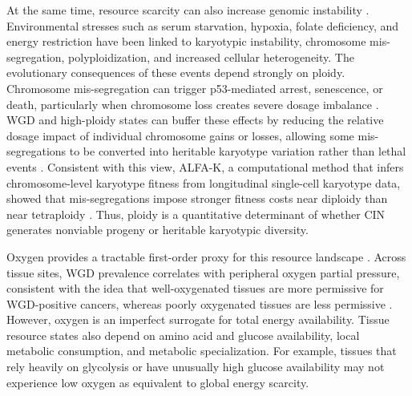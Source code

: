 \documentclass[11pt]{article}
\begin{document}
At the same time, resource scarcity can also increase genomic instability \cite{nowicka_interactions_2025,beck_energetics_2025}. Environmental stresses such as serum starvation, hypoxia, folate deficiency, and energy restriction have been linked to karyotypic instability, chromosome mis-segregation, polyploidization, and increased cellular heterogeneity. The evolutionary consequences of these events depend strongly on ploidy. Chromosome mis-segregation can trigger p53-mediated arrest, senescence, or death, particularly when chromosome loss creates severe dosage imbalance \cite{vitale_intratumor_2013,bakhoum_chromosomal_2012,thompson_proliferation_2010,sheltzer_single-chromosome_2017,silk_chromosome_2013}. WGD and high-ploidy states can buffer these effects by reducing the relative dosage impact of individual chromosome gains or losses, allowing some mis-segregations to be converted into heritable karyotype variation rather than lethal events \cite{lopez_interplay_2020,elizalde_markov_2018,santaguida_chromosome_2017}. Consistent with this view, ALFA-K, a computational method that infers chromosome-level karyotype fitness from longitudinal single-cell karyotype data, showed that mis-segregations impose stronger fitness costs near diploidy than near tetraploidy \cite{beck_alfa-k_2025}. Thus, ploidy is a quantitative determinant of whether CIN generates nonviable progeny or heritable karyotypic diversity.

Oxygen provides a tractable first-order proxy for this resource landscape \cite{nowicka_interactions_2025,beck_energetics_2025,donovan_hyperdiploid_2014}. Across tissue sites, WGD prevalence correlates with peripheral oxygen partial pressure, consistent with the idea that well-oxygenated tissues are more permissive for WGD-positive cancers, whereas poorly oxygenated tissues are less permissive \cite{donovan_hyperdiploid_2014,beck_energetics_2025}. However, oxygen is an imperfect surrogate for total energy availability. Tissue resource states also depend on amino acid and glucose availability, local metabolic consumption, and metabolic specialization. For example, tissues that rely heavily on glycolysis or have unusually high glucose availability may not experience low oxygen as equivalent to global energy scarcity.
\end{document}
